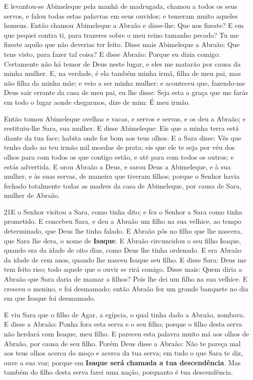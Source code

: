 E levantou-se Abimeleque pela manhã de madrugada, chamou a todos
os seus servos, e falou todas estas palavras em seus ouvidos; e
temeram muito aqueles homens. Então chamou Abimeleque a Abraão e
disse-lhe: Que nos fizeste? E em que pequei contra ti, para trazeres
sobre o meu reino tamanho pecado? Tu me fizeste aquilo que não
deverias ter feito. Disse mais Abimeleque a Abraão: Que tens
visto, para fazer tal coisa? E disse Abraão: Porque eu dizia
comigo: Certamente não há temor de Deus neste lugar, e eles me
matarão por causa da minha mulher. E, na verdade, é ela
também minha irmã, filha de meu pai, mas não filha da minha mãe; e
veio a ser minha mulher; e aconteceu que, fazendo-me Deus
sair errante da casa de meu pai, eu lhe disse: Seja esta a graça que
me farás em todo o lugar aonde chegarmos, dize de mim: É meu irmão.

Então tomou Abimeleque ovelhas e vacas, e servos e servas, e os
deu a Abraão; e restituiu-lhe Sara, sua mulher. E disse
Abimeleque: Eis que a minha terra está diante da tua face; habita
onde for bom aos teus olhos. E a Sara disse: Vês que tenho
dado ao teu irmão mil moedas de prata; eis que ele te seja por véu
dos olhos para com todos os que contigo estão, e até para com todos
os outros; e estás advertida. E orou Abraão a Deus, e sarou
Deus a Abimeleque, e à sua mulher, e às suas servas, de maneira que
tiveram filhos; porque o Senhor havia fechado totalmente
todas as madres da casa de Abimeleque, por causa de Sara, mulher de
Abraão.

\smallskip

\lettrine{21} E o Senhor visitou a Sara, como tinha dito; e
fez o Senhor a Sara como tinha prometido. E concebeu Sara, e deu
a Abraão um filho na sua velhice, ao tempo determinado, que Deus lhe
tinha falado. E Abraão pôs no filho que lhe nascera, que Sara
lhe dera, o nome de \textbf{Isaque}. E Abraão circuncidou o seu
filho Isaque, quando era da idade de oito dias, como Deus lhe tinha
ordenado. E era Abraão da idade de cem anos, quando lhe nasceu
Isaque seu filho. E disse Sara: Deus me tem feito riso; todo
aquele que o ouvir se rirá comigo. Disse mais: Quem diria a
Abraão que Sara daria de mamar a filhos? Pois lhe dei um filho na
sua velhice. E cresceu o menino, e foi desmamado; então Abraão
fez um grande banquete no dia em que Isaque foi desmamado.

E viu Sara que o filho de Agar, a egípcia, o qual tinha dado a
Abraão, zombava. E disse a Abraão: Ponha fora esta serva e o
seu filho; porque o filho desta serva não herdará com Isaque, meu
filho. E pareceu esta palavra muito má aos olhos de Abraão,
por causa de seu filho. Porém Deus disse a Abraão: Não te
pareça mal aos teus olhos acerca do moço e acerca da tua serva; em
tudo o que Sara te diz, ouve a sua voz; porque em \textbf{Isaque
será chamada a tua descendência}. Mas também do filho desta
serva farei uma nação, porquanto é tua descendência.

